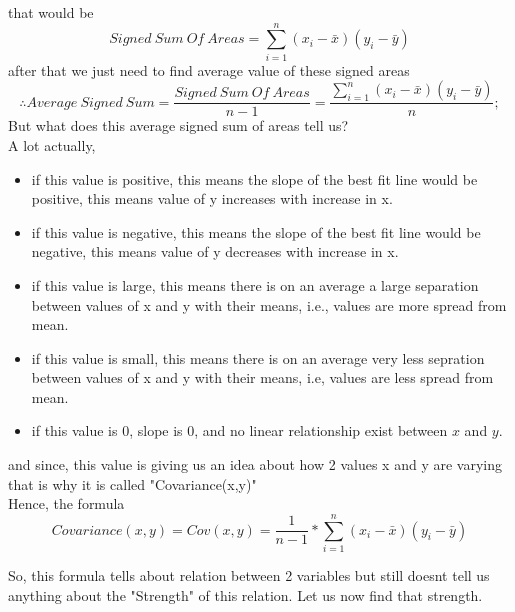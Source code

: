 \documentclass{article}
\begin{document}
that would be
$$
  Signed\ Sum\ Of\ Areas=\sum_{i=1}^{n}(x_i-\bar{x})(y_i-\bar{y})
$$
after that we just need to find average value of these signed areas
$$
  \therefore Average\ Signed\ Sum=\frac{Signed\ Sum\ Of\ Areas}{n-1}=\frac{\sum_{i=1}^{n}(x_i-\bar{x})(y_i-\bar{y})}{n};
$$
But what does this average signed sum of areas tell us?\\
A lot actually,
\begin{itemize}

  \item if this value is positive, this means the slope of the best fit line would be positive, this means value of y increases with increase in x.
  \item if this value is negative, this means the slope of the best fit line would be negative, this means value of y decreases with increase in x.
  \item if this value is large, this means there is on an average a large separation between values of x and y with their means, i.e., values are more spread from mean.
  \item if this value is small, this means there is on an average very less sepration between values of x and y with their means, i.e, values are less spread from mean.
  \item if this value is 0, slope is 0, and no linear relationship exist between $x$ and $y$.
\end{itemize}
and since, this value is giving us an idea about how 2 values x and y are varying\\
that is why it is called "Covariance(x,y)"\\
Hence, the formula
$$
  Covariance(x,y)=Cov(x,y)=\frac{1}{n-1}*\sum_{i=1}^{n}(x_i-\bar{x})(y_i-\bar{y})
$$

So, this formula tells about relation between 2 variables but still doesnt tell us anything about the "Strength" of this relation.
Let us now find that strength.\\
\end{document}
